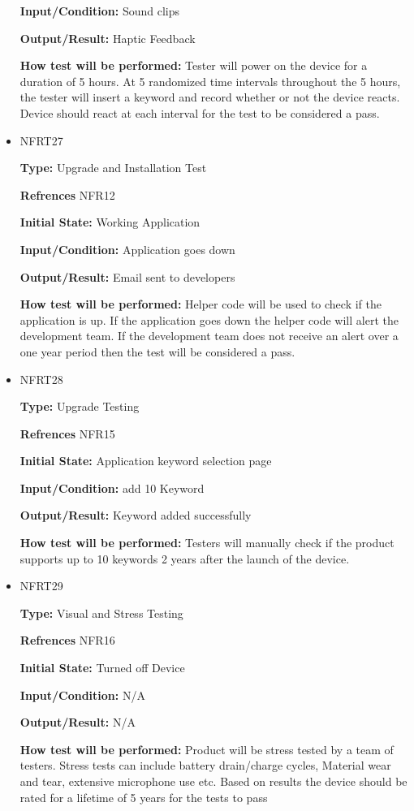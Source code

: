 \documentclass[12pt, titlepage]{article}
\begin{document}
\begin{itemize}
\textbf{Input/Condition:} Sound clips
					
\textbf{Output/Result:} Haptic Feedback
					
\textbf{How test will be performed:} Tester will power on the device for a duration of 5 hours. At 5 randomized time intervals throughout the 5 hours, the tester will insert a keyword and record whether or not the device reacts. Device should react at each interval for the test to be considered a pass.

\item{NFRT27}

\textbf{Type:} Upgrade and Installation Test

\textbf{Refrences} NFR12
					
\textbf{Initial State:} Working Application
					
\textbf{Input/Condition:} Application goes down
					
\textbf{Output/Result:} Email sent to developers
					
\textbf{How test will be performed:} Helper code will be used to check if the application is up. If the application goes down the helper code will alert the development team. If the development team does not receive an alert over a one year period then the test will be considered a pass. 

\item{NFRT28}

\textbf{Type:} Upgrade Testing

\textbf{Refrences} NFR15
					
\textbf{Initial State:} Application keyword selection page
					
\textbf{Input/Condition:} add 10 Keyword
					
\textbf{Output/Result:} Keyword added successfully
					
\textbf{How test will be performed:} Testers will manually check if the product supports up to 10 keywords 2 years after the launch of the device.

\item{NFRT29}

\textbf{Type:} Visual and Stress Testing

\textbf{Refrences} NFR16
					
\textbf{Initial State:} Turned off Device
					
\textbf{Input/Condition:} N/A
					
\textbf{Output/Result:} N/A
					
\textbf{How test will be performed:} Product will be stress tested by a team of testers. Stress tests can include battery drain/charge cycles, Material wear and tear, extensive microphone use etc. Based on results the device should be rated for a lifetime of 5 years for the tests to pass


\end{itemize}
\end{document}
